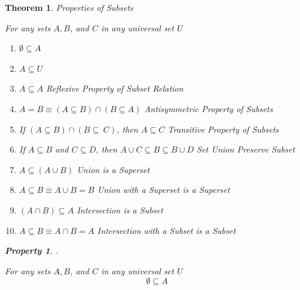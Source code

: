 \documentclass{book}
\newtheorem{theorem}{Theorem}[section]
\newtheorem{property}{Property}[theorem]
\theoremstyle{definition}
\theoremstyle{remark}
\begin{document}
\newpage
\begin{theorem}
Properties of Subsets \\

    \begin{tcolorbox}
        For any sets $A, B$, and $C$ in any universal set $U$ \\

        \begin{enumerate}
            \item $\emptyset \subseteq A$ %
            
            \item $A \subseteq U$  
            
            \item $A \subseteq A$ \textit{Reflexive Property of Subset Relation} %
            
            \item $A = B \equiv (A \subseteq B) \cap (B \subseteq A)$ \textit{Antisymmetric Property of Subsets} %
            
            \item If $(A \subseteq B) \cap (B \subseteq\ C)$, then $A \subseteq C$ \textit{Transitive Property of Subsets}  %

            \item If $A \subseteq B$ and $C \subseteq D$, then $A \cup C \subseteq B \subseteq B \cup D$ Set Union Preserve Subset
            
            \item $A \subseteq (A \cup B)$ Union is a Superset %
            
            \item $A \subseteq B \equiv A \cup B = B$ Union with a Superset is a Superset  %
            
            \item $(A \cap B) \subseteq A$ Intersection is a Subset %
            
            \item $A \subseteq B \equiv A \cap B = A$ Intersection with a Subset is a Subset %
        \end{enumerate}
    \end{tcolorbox}




    \newpage
    \begin{property}
    .\\
        \begin{tcolorbox}
            For any sets $A, B$, and $C$ in any universal set $U$
                \begin{equation*}
                    \emptyset \subseteq A
                \end{equation*}
        \end{tcolorbox}
    

\end{property}
\end{theorem}
\end{document}
